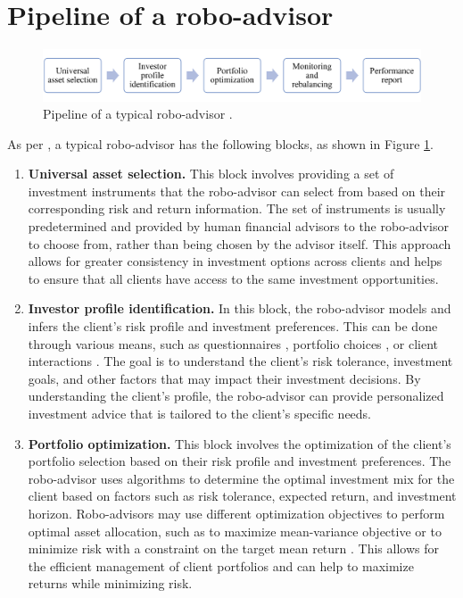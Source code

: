 \section{Pipeline of a robo-advisor}
\begin{figure}
    \centering
    \includegraphics[width=1\textwidth]{imgs/pipeline.pdf}
    \caption{Pipeline of a typical robo-advisor \protect\cite{beketov2018robo}.}
    \label{fig:pipeline}
\end{figure}
As per \cite{beketov2018robo}, a typical robo-advisor has the following blocks, as shown in Figure \ref{fig:pipeline}.\begin{enumerate}
    \item \textbf{Universal asset selection.} This block involves providing a set of investment instruments that the robo-advisor can select from based on their corresponding risk and return information. The set of instruments is usually predetermined and provided by human financial advisors to the robo-advisor to choose from, rather than being chosen by the advisor itself. This approach allows for greater consistency in investment options across clients and helps to ensure that all clients have access to the same investment opportunities.

    \item \textbf{Investor profile identification.} In this block, the robo-advisor models and infers the client's risk profile and investment preferences. This can be done through various means, such as questionnaires \cite{tertilt2018advise}, portfolio choices \cite{alsabah2021robo}, or client interactions \cite{capponi2022personalized}. The goal is to understand the client's risk tolerance, investment goals, and other factors that may impact their investment decisions. By understanding the client's profile, the robo-advisor can provide personalized investment advice that is tailored to the client's specific needs.

    \item \textbf{Portfolio optimization.} This block involves the optimization of the client's portfolio selection based on their risk profile and investment preferences. The robo-advisor uses algorithms to determine the optimal investment mix for the client based on factors such as risk tolerance, expected return, and investment horizon. Robo-advisors may use different optimization objectives to perform optimal asset allocation, such as to maximize mean-variance objective \cite{capponi2022personalized,alsabah2021robo,wang2021robo} or to minimize risk with a constraint on the target mean return \cite{wang2020continuous}. This allows for the efficient management of client portfolios and can help to maximize returns while minimizing risk.


\end{enumerate}
